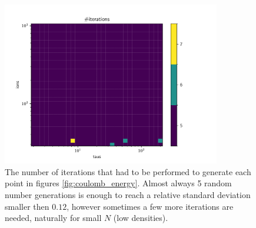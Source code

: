 \begin{figure}
	\begin{center}
		\includegraphics[width=0.85\textwidth]{graphics/coulomb_energy_example@iterations.pdf}
	\end{center}
	\caption{The number of iterations that had to be performed to generate each point in figures \ref{fig:coulomb_energy}. Almost always 5 random number generations is enough to reach a relative standard deviation smaller then $0.12$, however sometimes a few more iterations are needed, naturally for small $N$ (low densities).}
	\label{fig:coulomb_energy_iterations}
\end{figure}
